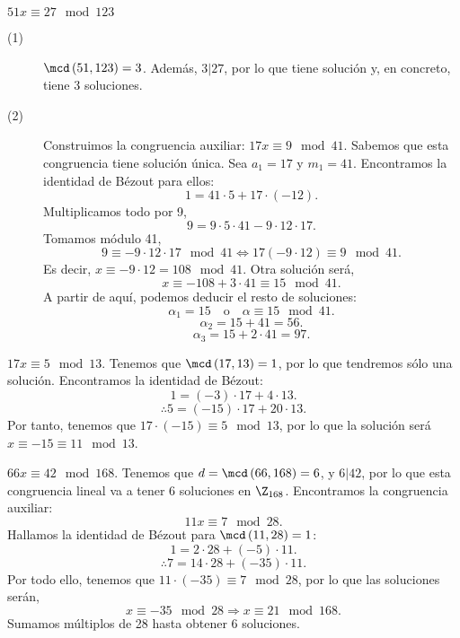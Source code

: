 \begin{eg}
\normalfont $\displaystyle 51x \equiv 27 \mod 123 $ 
\begin{description}
\item[(1)] $\displaystyle \mcd\left(51,123\right) = 3 $. Además, $\displaystyle 3 | 27 $, por lo que tiene solución y, en concreto, tiene 3 soluciones. 
\item[(2)] Construimos la congruencia auxiliar: $\displaystyle 17 x \equiv 9 \mod 41 $. Sabemos que esta congruencia tiene solución única. Sea $\displaystyle a_{1} = 17 $ y $\displaystyle m_{1} = 41 $. Encontramos la identidad de Bézout para ellos:
	\[ 1 = 41 \cdot 5 + 17 \cdot \left(-12\right) .\]
Multiplicamos todo por 9, 
\[9 = 9 \cdot 5 \cdot 41 - 9 \cdot 12 \cdot 17 .\]
Tomamos módulo 41, 
\[9 \equiv -9 \cdot 12 \cdot 17 \mod 41 \iff 17 \left(-9 \cdot 12\right) \equiv  9 \mod 41 .\]
Es decir, $\displaystyle x \equiv - 9 \cdot 12 = 108 \mod 41 $. Otra solución será, 
\[x \equiv -108 + 3 \cdot 41 \equiv 15 \mod 41 .\]
A partir de aquí, podemos deducir el resto de soluciones:
\[\alpha_{1} = 15 \quad \text{o} \quad \alpha \equiv 15 \mod 41 .\]
\[\alpha _{2} = 15 + 41 = 56 .\]
\[\alpha_{3} = 15 + 2 \cdot 41 = 97 .\]
\end{description}
\end{eg}
\begin{eg}
\normalfont $\displaystyle 17 x \equiv 5 \mod 13 $. Tenemos que $\displaystyle \mcd\left(17, 13\right) = 1 $, por lo que tendremos sólo una solución. Encontramos la identidad de Bézout:
\[1 = \left(-3\right) \cdot 17 + 4 \cdot 13 .\]
\[\therefore 5 = \left(-15\right) \cdot 17 + 20 \cdot 13 .\]
Por tanto, tenemos que $\displaystyle 17 \cdot \left(-15\right) \equiv 5 \mod 13 $, por lo que la solución será $\displaystyle x \equiv -15 \equiv 11 \mod 13 $.
\end{eg}

\begin{eg}
\normalfont $\displaystyle 66x \equiv 42 \mod 168 $. Tenemos que $\displaystyle d = \mcd\left(66, 168\right) = 6 $, y $\displaystyle 6|42 $, por lo que esta congruencia lineal va a tener 6 soluciones en $\displaystyle \Z_{168} $. Encontramos la congruencia auxiliar:
\[11x \equiv 7 \mod 28 .\]
Hallamos la identidad de Bézout para $\displaystyle \mcd\left(11, 28\right) = 1 $:
\[ 1 = 2 \cdot 28 + \left(-5\right) \cdot 11 .\]
\[\therefore 7 = 14 \cdot 28 + \left(-35\right) \cdot 11 .\]
Por todo ello, tenemos que $\displaystyle 11 \cdot \left(-35\right) \equiv 7 \mod 28 $, por lo que las soluciones serán, 
\[x \equiv -35 \mod 28 \Rightarrow x \equiv 21 \mod 168 .\]
Sumamos múltiplos de 28 hasta obtener 6 soluciones.
\end{eg}


